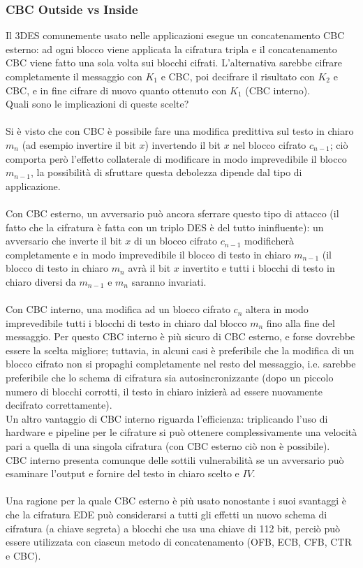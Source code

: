 \subsubsection{CBC Outside vs Inside}
Il 3DES comunemente usato nelle applicazioni esegue un concatenamento CBC esterno: ad ogni blocco viene applicata la cifratura tripla e il concatenamento CBC viene fatto una sola volta sui blocchi cifrati. L'alternativa sarebbe cifrare completamente il messaggio con $K_{1}$ e CBC, poi decifrare il risultato con $K_{2}$ e CBC, e in fine cifrare di nuovo quanto ottenuto con $K_{1}$ (CBC interno).\\
Quali sono le implicazioni di queste scelte?\\ \\
Si è visto che con CBC è possibile fare una modifica predittiva sul testo in chiaro $m_{n}$ (ad esempio invertire il bit $x$) invertendo il bit $x$ nel blocco cifrato $c_{n-1}$; ciò comporta però l'effetto collaterale di modificare
in modo imprevedibile il blocco $m_{n-1}$, la possibilità di sfruttare questa debolezza dipende dal tipo di applicazione.\\ \\
Con CBC esterno, un avversario può ancora sferrare questo tipo di attacco (il fatto che la cifratura è fatta con un triplo DES è del tutto ininfluente): un avversario che inverte il bit $x$ di un blocco cifrato $c_{n-1}$ modificherà completamente e in modo imprevedibile il blocco di testo in chiaro $m_{n-1}$ (il blocco di testo in chiaro $m_{n}$ avrà il bit $x$ invertito e tutti i blocchi di testo in chiaro diversi da $m_{n-1}$ e $m_{n}$ saranno invariati.\\ \\
Con CBC interno, una modifica ad un blocco cifrato $c_{n}$ altera in modo imprevedibile tutti i blocchi di testo in
chiaro dal blocco $m_{n}$ fino alla fine del messaggio. Per questo CBC interno è più sicuro di CBC esterno, e forse
dovrebbe essere la scelta migliore; tuttavia, in alcuni casi è preferibile che la modifica di un blocco cifrato non si propaghi completamente nel resto del messaggio, i.e. sarebbe preferibile che lo schema di cifratura sia autosincronizzante (dopo un piccolo numero di blocchi corrotti, il testo in chiaro inizierà ad essere nuovamente decifrato correttamente). \\
Un altro vantaggio di CBC interno riguarda l'efficienza: triplicando l'uso di hardware e pipeline per le cifrature si può ottenere complessivamente una velocità pari a quella di una singola cifratura (con CBC esterno ciò non è possibile).\\
CBC interno presenta comunque delle sottili vulnerabilità se un avversario può esaminare l'output e fornire del testo in chiaro scelto e $IV$.\\ \\
Una ragione per la quale CBC esterno è più usato nonostante i suoi svantaggi è che la cifratura EDE può considerarsi a tutti gli effetti un nuovo schema di cifratura (a chiave segreta) a blocchi che usa una chiave di 112 bit, perciò può essere utilizzata con ciascun metodo di concatenamento (OFB, ECB, CFB, CTR e CBC).

